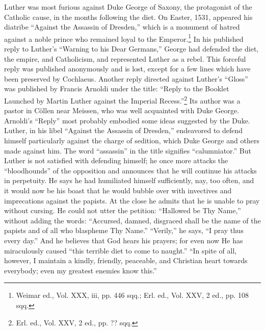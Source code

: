 Luther was most furious against Duke George of Saxony, the
protagonist of the Catholic cause, in the months following the diet.
On Easter, 1531, appeared his diatribe “Against the Assassin of Dresden,”
which is a monument of hatred against a noble prince who
remained loyal to the Emperor.\footnote
{Weimar ed., Vol. XXX, iii, pp. 446 sqq.; Erl. ed., Vol. XXV, 2 ed., pp. 108 sqq.}
 In his published reply to Luther’s
“Warning to his Dear Germans,” George had defended the diet, the
empire, and Catholicism, and represented Luther as a rebel. This forceful
reply was published anonymously and is lost, except for a few
lines which have been preserved by Cochlaeus. Another reply directed
against Luther’s “Gloss” was published by Francis Arnoldi
under the title: “Reply to the Booklet Launched by Martin Luther
against the Imperial Recess.”\footnote{Erl. ed., Vol. XXV, 2 ed., pp. ?? sqq.}
Its author was a pastor in Cöllen
near Meissen, who was well acquainted with Duke George. Arnoldi’s
“Reply” most probably embodied some ideas suggested by the Duke.
Luther, in his libel “Against the Assassin of Dresden,” endeavored
to defend himself particularly against the charge of sedition, which
Duke George and others made against him. The word “assassin” in
the title signifies “calumniator.” But Luther is not satisfied with
defending himself; he once more attacks the “bloodhounds” of the
opposition and announces that he will continue his attacks in perpetuity.
He says he had humiliated himself sufficiently, nay, too often,
and it would now be his boast that he would bubble over with invectives
and imprecations against the papists. At the close he admits
that he is unable to pray without cursing. He could not utter the petition:
“Hallowed be Thy Name,” without adding the words: “Accursed, damned, disgraced
shall be the name of the papists and of all
who blaspheme Thy Name.” “Verily,” he says, “I pray thus every
day.” And he believes that God hears his prayers; for even now He has
miraculously caused “this terrible diet to come to naught.” “In spite
of all, however, I maintain a kindly, friendly, peaceable, and Christian
heart towards everybody; even my greatest enemies know this.”

